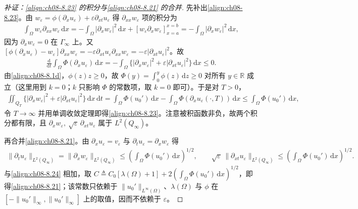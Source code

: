\documentclass[../../main.tex]{subfiles}%
\begin{document}
\begin{proof}[补证：\eqref{align:ch08-8.23} 的积分与\eqref{align:ch08-8.21} 的合并]
先补出\eqref{align:ch08-8.23}。由 $w_\varepsilon=\phi(\partial_xu_\varepsilon)+\varepsilon\partial_{xt}u_\varepsilon$ 得 $\partial_{xx}w_\varepsilon$ 项的积分为
\begin{align*}
\int_\Omega w_\varepsilon\partial_{xx}w_\varepsilon\,\mathrm{d}x
=-\int_\Omega|\partial_xw_\varepsilon|^2\,\mathrm{d}x+[w_\varepsilon\partial_xw_\varepsilon]_{x=a}^{x=b}
=-\int_\Omega|\partial_xw_\varepsilon|^2\,\mathrm{d}x,
\end{align*}
因为 $\partial_xw_\varepsilon=0$ 在 $\Gamma_\infty$ 上。又 $[\phi(\partial_xu_\varepsilon)-w_\varepsilon]\partial_{xx}w_\varepsilon=-\varepsilon\partial_{xt}u_\varepsilon\partial_{xx}w_\varepsilon=-\varepsilon|\partial_{xt}u_\varepsilon|^2$。故
\begin{align*}
\frac{\mathrm{d}}{\mathrm{d}t}\int_\Omega\Phi(\partial_xu_\varepsilon)\,\mathrm{d}x
=-\int_\Omega\{|\partial_xw_\varepsilon|^2+\varepsilon|\partial_{xt}u_\varepsilon|^2\}\,\mathrm{d}x\leqslant0.
\end{align*}
由\eqref{align:ch08-8.1d}，$\phi(z)z\geqslant0$，故 $\Phi(y)=\int_0^y\phi(z)\,\mathrm{d}z\geqslant0$ 对所有 $y\in\mathbb{R}$ 成立（这里用到 $k=0$；$k$ 只影响 $\Phi$ 的常数项，取 $k=0$ 即可）。于是对 $T>0$，
\begin{align*}
\iint_{Q_T}\{|\partial_xw_\varepsilon|^2+\varepsilon|\partial_{xt}u_\varepsilon|^2\}\,\mathrm{d}x\,\mathrm{d}t
=\int_\Omega\Phi(u_0')\,\mathrm{d}x-\int_\Omega\Phi(\partial_xu_\varepsilon(\cdot,T))\,\mathrm{d}x
\leqslant\int_\Omega\Phi(u_0')\,\mathrm{d}x,
\end{align*}
令 $T\to\infty$ 并用单调收敛定理即得\eqref{align:ch08-8.23}。注意被积函数非负，故两个积分都有限，且 $\partial_xw_\varepsilon,\ \sqrt{\varepsilon}\,\partial_{xt}u_\varepsilon$ 属于 $L^2(Q_\infty)$。

再合并\eqref{align:ch08-8.21}。由 $\partial_xu_\varepsilon=v_\varepsilon$ 与 $\partial_tu_\varepsilon=\partial_xw_\varepsilon$ 得
\begin{align*}
\|\partial_tu_\varepsilon\|_{L^2(Q_\infty)}=\|\partial_xw_\varepsilon\|_{L^2(Q_\infty)}
\leqslant\left(\int_\Omega\Phi(u_0')\,\mathrm{d}x\right)^{1/2},\qquad
\sqrt{\varepsilon}\,\|\partial_{xt}u_\varepsilon\|_{L^2(Q_\infty)}
\leqslant\left(\int_\Omega\Phi(u_0')\,\mathrm{d}x\right)^{1/2}.
\end{align*}
与\eqref{align:ch08-8.24} 相加，取 $C\triangleq C_0[\lambda(\Omega)+1]+2\left(\int_\Omega\Phi(u_0')\,\mathrm{d}x\right)^{1/2}$，即得\eqref{align:ch08-8.21}；该常数只依赖于 $\|u_0'\|_{L^\infty(\Omega)}$、$\lambda(\Omega)$ 与 $\phi$ 在 $[-\|u_0'\|_\infty,\|u_0'\|_\infty]$ 上的取值，因而不依赖于 $\varepsilon$。
\end{proof}
\end{document}

